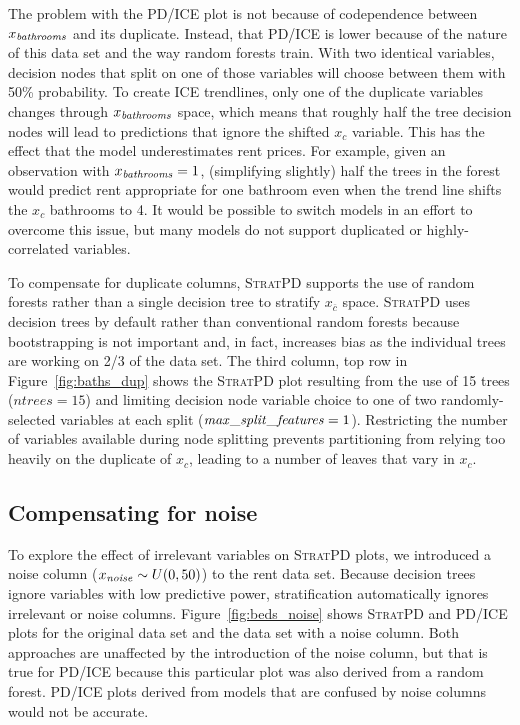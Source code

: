 \documentclass[12pt]{article}
\newcommand{\figref}[1]{Figure~\ref{#1}}
\newcommand{\spd}{\fontfamily{cmr}\textsc{\small StratPD}}
\newcommand{\xnc}{$x_{\overline{c}}$}
\begin{document}
The problem with the PD/ICE plot is not because of codependence between $x_{\it bathrooms}$ and its duplicate. Instead, that PD/ICE is lower because of the nature of this data set and the way random forests train. With two identical variables, decision nodes that split on one of those variables will choose between them with 50\% probability.  To create ICE trendlines, only one of the duplicate variables changes through $x_{\it bathrooms}$ space, which means that roughly half the tree decision nodes will lead to predictions that ignore the shifted $x_c$ variable.  This has the effect that the model underestimates rent prices.  For example, given an observation with $x_{\it bathrooms}=1$, (simplifying slightly) half the trees in the forest would predict rent appropriate for one bathroom even when the trend line shifts the $x_c$ bathrooms to 4. It would be possible to switch models in an effort to overcome this issue, but many models do not support duplicated or highly-correlated variables.

To compensate for duplicate columns, \spd{} supports the use of random forests rather than a single decision tree to stratify \xnc{} space. \spd{} uses decision trees by default rather than conventional random forests because bootstrapping is not important and, in fact, increases bias as the individual trees are working on 2/3 of the data set. The third column, top row in \figref{fig:baths_dup} shows the \spd{} plot resulting from the use of 15 trees ($ntrees=15$) and limiting decision node variable choice to one of two randomly-selected variables at each split (${\it max\_split\_features}=1$).  Restricting the number of variables available during node splitting prevents partitioning from relying too heavily on the duplicate of $x_c$, leading to a number of leaves that vary in $x_c$.

\subsection{Compensating for noise}\label{sec:noise}

To explore the effect of irrelevant variables on \spd{} plots, we introduced a noise column ($x_{\it noise} \sim U(0,50)$) to the rent data set. Because decision trees ignore variables with low predictive power, stratification automatically ignores irrelevant or noise columns.  \figref{fig:beds_noise} shows \spd{} and PD/ICE plots for the original data set and the data set with a noise column. Both approaches are unaffected by the introduction of the noise column, but that is true for PD/ICE because this particular plot was also derived from a random forest. PD/ICE plots derived from models that are confused by noise columns would not be accurate.
\end{document}
